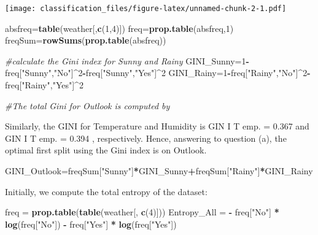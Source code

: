 \documentclass[]{article}
\newenvironment{Shaded}{\begin{snugshade}}{\end{snugshade}}
\newcommand{\CommentTok}[1]{\textcolor[rgb]{0.56,0.35,0.01}{\textit{#1}}}
\newcommand{\DecValTok}[1]{\textcolor[rgb]{0.00,0.00,0.81}{#1}}
\newcommand{\KeywordTok}[1]{\textcolor[rgb]{0.13,0.29,0.53}{\textbf{#1}}}
\newcommand{\NormalTok}[1]{#1}
\newcommand{\OperatorTok}[1]{\textcolor[rgb]{0.81,0.36,0.00}{\textbf{#1}}}
\newcommand{\StringTok}[1]{\textcolor[rgb]{0.31,0.60,0.02}{#1}}
\begin{document}
\texttt{[image: classification\_files/figure-latex/unnamed-chunk-2-1.pdf]}

\begin{Shaded}
\begin{Highlighting}[]
\NormalTok{absfreq=}\KeywordTok{table}\NormalTok{(weather[,}\KeywordTok{c}\NormalTok{(}\DecValTok{1}\NormalTok{,}\DecValTok{4}\NormalTok{)])}
\NormalTok{freq=}\KeywordTok{prop.table}\NormalTok{(absfreq,}\DecValTok{1}\NormalTok{)}
\NormalTok{freqSum=}\KeywordTok{rowSums}\NormalTok{(}\KeywordTok{prop.table}\NormalTok{(absfreq))}
\end{Highlighting}
\end{Shaded}

\begin{Shaded}
\begin{Highlighting}[]
\CommentTok{#calculate the Gini index for Sunny and Rainy}
\NormalTok{GINI_Sunny=}\DecValTok{1}\OperatorTok{-}\NormalTok{freq[}\StringTok{"Sunny"}\NormalTok{,}\StringTok{"No"}\NormalTok{]}\OperatorTok{^}\DecValTok{2}\OperatorTok{-}\NormalTok{freq[}\StringTok{"Sunny"}\NormalTok{,}\StringTok{"Yes"}\NormalTok{]}\OperatorTok{^}\DecValTok{2}
\NormalTok{GINI_Rainy=}\DecValTok{1}\OperatorTok{-}\NormalTok{freq[}\StringTok{"Rainy"}\NormalTok{,}\StringTok{"No"}\NormalTok{]}\OperatorTok{^}\DecValTok{2}\OperatorTok{-}\NormalTok{freq[}\StringTok{"Rainy"}\NormalTok{,}\StringTok{"Yes"}\NormalTok{]}\OperatorTok{^}\DecValTok{2}

\CommentTok{#The total Gini for Outlook is computed by}
\end{Highlighting}
\end{Shaded}

Similarly, the GINI for Temperature and Humidity is GIN I T emp. = 0.367
and GIN I T emp. = 0.394 , respectively. Hence, answering to question
(a), the optimal first split using the Gini index is on Outlook.

\begin{Shaded}
\begin{Highlighting}[]
\NormalTok{GINI_Outlook=freqSum[}\StringTok{"Sunny"}\NormalTok{]}\OperatorTok{*}\NormalTok{GINI_Sunny}\OperatorTok{+}\NormalTok{freqSum[}\StringTok{"Rainy"}\NormalTok{]}\OperatorTok{*}\NormalTok{GINI_Rainy}
\end{Highlighting}
\end{Shaded}

Initially, we compute the total entropy of the dataset:

\begin{Shaded}
\begin{Highlighting}[]
\NormalTok{freq =}\StringTok{ }\KeywordTok{prop.table}\NormalTok{(}\KeywordTok{table}\NormalTok{(weather[, }\KeywordTok{c}\NormalTok{(}\DecValTok{4}\NormalTok{)]))}
\NormalTok{Entropy_All =}\StringTok{ }\OperatorTok{-}\StringTok{ }\NormalTok{freq[}\StringTok{"No"}\NormalTok{] }\OperatorTok{*}\StringTok{ }\KeywordTok{log}\NormalTok{(freq[}\StringTok{"No"}\NormalTok{]) }\OperatorTok{-}\StringTok{ }\NormalTok{freq[}\StringTok{"Yes"}\NormalTok{] }\OperatorTok{*}\StringTok{ }\KeywordTok{log}\NormalTok{(freq[}\StringTok{"Yes"}\NormalTok{])}
\end{Highlighting}
\end{Shaded}
\end{document}
